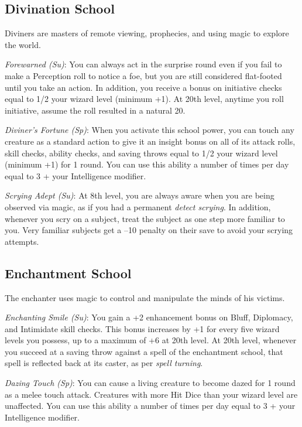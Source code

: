 \subsection{Divination School}

				
Diviners are masters of remote viewing, prophecies, and using magic to explore the world.
				
\textit{Forewarned (Su)}: You can always act in the surprise round even if you fail to make a Perception roll to notice a foe, but you are still considered flat-footed until you take an action. In addition, you receive a bonus on initiative checks equal to 1/2 your wizard level (minimum +1). At 20th level, anytime you roll initiative, assume the roll resulted in a natural 20.
				
\textit{Diviner's Fortune (Sp)}: When you activate this school power, you can touch any creature as a standard action to give it an insight bonus on all of its attack rolls, skill checks, ability checks, and saving throws equal to 1/2 your wizard level (minimum +1) for 1 round. You can use this ability a number of times per day equal to 3 + your Intelligence modifier.
				
\textit{Scrying Adept (Su)}: At 8th level, you are always aware when you are being observed via magic, as if you had a permanent \textit{detect scrying}. In addition, whenever you scry on a subject, treat the subject as one step more familiar to you. Very familiar subjects get a --10 penalty on their save to avoid your scrying attempts.
				
\subsection{Enchantment School}

				
The enchanter uses magic to control and manipulate the minds of his victims.
				
\textit{Enchanting Smile (Su)}: You gain a +2 enhancement bonus on Bluff, Diplomacy, and Intimidate skill checks. This bonus increases by +1 for every five wizard levels you possess, up to a maximum of +6 at 20th level. At 20th level, whenever you succeed at a saving throw against a spell of the enchantment school, that spell is reflected back at its caster, as per \textit{spell turning}.
				
\textit{Dazing Touch (Sp)}: You can cause a living creature to become dazed for 1 round as a melee touch attack. Creatures with more Hit Dice than your wizard level are unaffected. You can use this ability a number of times per day equal to 3 + your Intelligence modifier.
				
